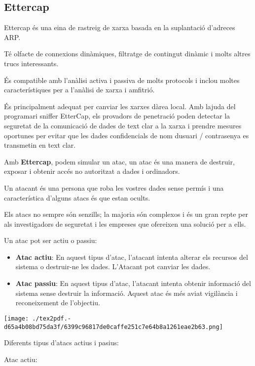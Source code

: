 \documentclass[]{article}
\begin{document}
\hypertarget{ettercap}{%
\subsection{\texorpdfstring{\textbf{Ettercap}}{Ettercap}}\label{ettercap}}

Ettercap és una eina de rastreig de xarxa basada en la suplantació
d'adreces ARP.

Té olfacte de connexions dinàmiques, filtratge de contingut dinàmic i
molts altres trucs interessants.

És compatible amb l'anàlisi activa i passiva de molts protocols i inclou
moltes característiques per a l'anàlisi de xarxa i amfitrió.

És principalment adequat per canviar les xarxes dàrea local. Amb lajuda
del programari sniffer EtterCap, els provadors de penetració poden
detectar la seguretat de la comunicació de dades de text clar a la xarxa
i prendre mesures oportunes per evitar que les dades confidencials de
nom dusuari / contrasenya es transmetin en text clar.

Amb \textbf{Ettercap}, podem simular un atac, un atac és una manera de
destruir, exposar i obtenir accés no autoritzat a dades i ordinadors.

Un atacant és una persona que roba les vostres dades sense permís i una
característica d'alguns atacs és que estan ocults.

Els atacs no sempre són senzills; la majoria són complexos i és un gran
repte per als investigadors de seguretat i les empreses que ofereixen
una solució per a ells.

Un atac pot ser actiu o passiu:

\begin{itemize}
\item
  \textbf{Atac actiu}: En aquest tipus d'atac, l'atacant intenta alterar
  els recursos del sistema o destruir-ne les dades. L'Atacant pot
  canviar les dades.
\item
  \textbf{Atac passiu}: En aquest tipus d'atac, l'atacant intenta
  obtenir informació del sistema sense destruir la informació. Aquest
  atac és més aviat vigilància i reconeixement de l'objectiu.
\end{itemize}

\texttt{[image: ./tex2pdf.-d65a4b08bd75da3f/6399c96817de0caffe251c7e64b8a1261eae2b63.png]}

Diferents tipus d'atacs actius i pasius:

Atac actiu:
\end{document}
